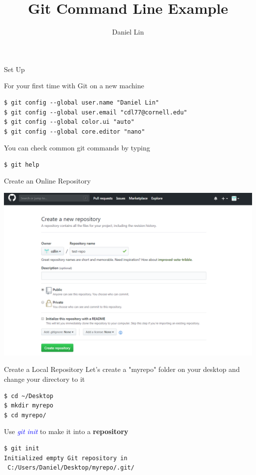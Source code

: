 \documentclass[11pt]{beamer}
\begin{document}
\title{Git Command Line Example}
\author{Daniel Lin}
\date{}


\maketitle



\begin{frame}[fragile]{Set Up}

For your first time with Git on a new machine
\begin{lstlisting}
$ git config --global user.name "Daniel Lin"
$ git config --global user.email "cdl77@cornell.edu"
$ git config --global color.ui "auto"
$ git config --global core.editor "nano"
\end{lstlisting}

You can check common git commands by typing
\begin{lstlisting}
$ git help
\end{lstlisting}
\end{frame}
\begin{frame}[fragile]{Create an Online Repository}
\begin{center}
	\includegraphics[width=1.0\textwidth]{./auxfiles/github_repo.png}
\end{center}
\end{frame}
\begin{frame}[fragile]{Create a Local Repository}
Let's create a "myrepo" folder on your desktop and change your directory to it
\begin{lstlisting}
$ cd ~/Desktop
$ mkdir myrepo
$ cd myrepo/
\end{lstlisting}
Use \textcolor{blue}{\emph{git init}} to make it into a \textbf{repository}
\begin{lstlisting}
$ git init
Initialized empty Git repository in
 C:/Users/Daniel/Desktop/myrepo/.git/
\end{lstlisting}
\end{frame}
\end{document}
